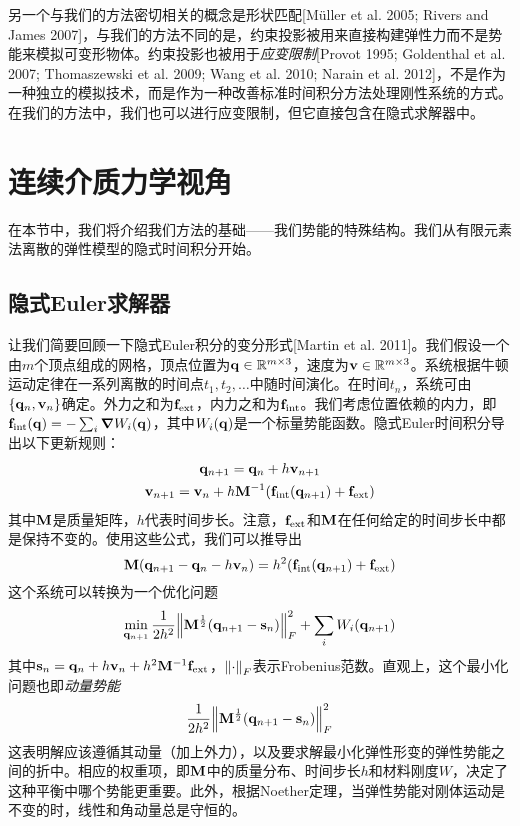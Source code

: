\begin{translation}
另一个与我们的方法密切相关的概念是形状匹配[Müller et al. 2005; Rivers and James 2007]，与我们的方法不同的是，约束投影被用来直接构建弹性力而不是势能来模拟可变形物体。约束投影也被用于\emph{应变限制}[Provot 1995; Goldenthal et al. 2007; Thomaszewski et al. 2009; Wang et al. 2010; Narain et al. 2012]，不是作为一种独立的模拟技术，而是作为一种改善标准时间积分方法处理刚性系统的方式。在我们的方法中，我们也可以进行应变限制，但它直接包含在隐式求解器中。

\section{连续介质力学视角}

在本节中，我们将介绍我们方法的基础——我们势能的特殊结构。我们从有限元素法离散的弹性模型的隐式时间积分开始。

\subsection{隐式Euler求解器}

让我们简要回顾一下隐式Euler积分的变分形式[Martin et al. 2011]。我们假设一个由$m$个顶点组成的网格，顶点位置为$\vb{q} \in \mathbb{R}^{m \times 3}$，速度为$\vb{v} \in \mathbb{R}^{m \times 3}$。系统根据牛顿运动定律在一系列离散的时间点$t_1, t_2, \dots$中随时间演化。在时间$t_n$，系统可由$\{\vb{q}_n, \vb{v}_n\}$确定。外力之和为$\vb{f}_{\text{ext}}$，内力之和为$\vb{f}_{\text{int}}$。我们考虑位置依赖的内力，即$\vb{f}_{\text{int}}(\vb{q}) = - \sum_i \grad{W_i(\vb{q})}$，其中$W_i(\vb{q})$是一个标量势能函数。隐式Euler时间积分导出以下更新规则：
\begin{gather}
  \vb{q}_{n + 1} = \vb{q}_n + h \vb{v}_{n + 1} \label{eq:translation-1} \\
  \vb{v}_{n + 1} = \vb{v}_n + h \vb{M}^{-1} (\vb{f}_{\text{int}}(\vb{q}_{n + 1}) + \vb{f}_{\text{ext}}) \label{eq:translation-2}
\end{gather}
其中$\vb{M}$是质量矩阵，$h$代表时间步长。注意，$\vb{f}_{\text{ext}}$和$\vb{M}$在任何给定的时间步长中都是保持不变的。使用这些公式，我们可以推导出
\begin{equation}
  \vb{M} (\vb{q}_{n + 1} - \vb{q}_n - h \vb{v}_n) = h^2 (\vb{f}_{\text{int}}(\vb{q}_{n + 1}) + \vb{f}_{\text{ext}})
  \label{eq:translation-3}
\end{equation}
这个系统可以转换为一个优化问题
\begin{equation}
  \min_{\vb{q}_{n + 1}} \frac{1}{2 h^2} \norm{\vb{M}^{\frac{1}{2}} (\vb{q}_{n + 1} - \vb{s}_n)}_F^2 + \sum_i W_i(\vb{q}_{n + 1})
  \label{eq:translation-4}
\end{equation}
其中$\vb{s}_n = \vb{q}_n + h \vb{v}_n + h^2 \vb{M}^{-1} \vb{f}_{\text{ext}}$，$\norm{\cdot}_F$表示Frobenius范数。直观上，这个最小化问题也即\emph{动量势能}
\begin{equation}
  \frac{1}{2 h^2} \norm{\vb{M}^{\frac{1}{2}} (\vb{q}_{n + 1} - \vb{s}_n)}_F^2
  \label{eq:translation-5}
\end{equation}
这表明解应该遵循其动量（加上外力），以及要求解最小化弹性形变的弹性势能之间的折中。相应的权重项，即$\vb{M}$中的质量分布、时间步长$h$和材料刚度$W$，决定了这种平衡中哪个势能更重要。此外，根据Noether定理，当弹性势能对刚体运动是不变的时，线性和角动量总是守恒的。


\end{translation}
